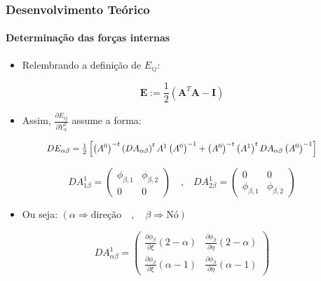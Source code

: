 \documentclass{beamer}
\begin{document}
\begin{frame}
    \frametitle{Desenvolvimento Teórico}
    \framesubtitle{Determinação das forças internas}
    \begin{itemize}
        \item Relembrando a definição de \(E_{ij}\):
    \end{itemize}

    \begin{equation}
        \mathbf{E}  := \frac{1}{2} \left(\mathbf{A} ^T \mathbf{A} - \mathbf{I}\right)
    \end{equation}

    \begin{itemize}
        \item Assim, \(\frac{\partial E_{ij}}{\partial Y_\alpha^\beta}\) assume a forma:
    \end{itemize}


    \begin{equation}
        \scalebox{0.9}{$
        DE_{\alpha\beta} =
        \frac{1}{2} \left[
        \left(A^0\right)^{-t} \left(DA_{\alpha\beta}\right)^t  A^1  \left(A^0\right)^{-1 }+\left(A^0\right)^{-t} \left(A^1\right)^t  DA_{\alpha\beta}  \left(A^0\right)^{-1}
        \right]
        $}
    \end{equation}



    \begin{equation}
        DA^1_{1\beta} =
        \begin{pmatrix}
        \phi_{\beta,1} & \phi_{\beta,2} \\
        0 & 0
        \end{pmatrix}
        \quad \text{,} \quad
        DA^1_{2\beta} =
        \begin{pmatrix}
        0 & 0 \\
        \phi_{\beta,1} & \phi_{\beta,2}
        \end{pmatrix}
    \end{equation}

    \begin{itemize}
        \item Ou seja: \( \left( \alpha \Rightarrow \text{direção} \quad , \quad \beta  \Rightarrow \text{Nó} \right)\)
    \end{itemize}

    \begin{equation}
        DA^1_{\alpha\beta} =
        \begin{pmatrix}
        \frac{\partial \phi_{\beta}}{\partial\xi}(2-\alpha) & \frac{\partial \phi_{\beta}}{\partial\eta}(2-\alpha) \\
        \frac{\partial \phi_{\beta}}{\partial\xi}(\alpha-1) & \frac{\partial \phi_{\beta}}{\partial\eta}(\alpha-1)
        \end{pmatrix}
    \end{equation}


\end{frame}
\end{document}
